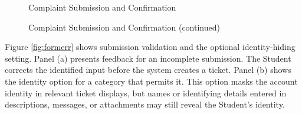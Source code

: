 \renewcommand{\thefigure}{5.7}
\begin{figure}[htbp]
    \centering
    \begin{minipage}[t]{0.43\linewidth}
        \centering
        \vspace{0pt}
        \par{}\par
    \end{minipage}\hspace{0.04\linewidth}
    \begin{minipage}[t]{0.43\linewidth}
        \centering
        \vspace{0pt}
        \par{}\par
    \end{minipage}
    \caption{Complaint Submission and Confirmation}
    \label{fig:form}
\end{figure}
\FloatBarrier

\begin{figure}[htbp]
    \ContinuedFloat
    \centering
    \begin{minipage}[t]{0.43\linewidth}
        \centering
        \vspace{0pt}
        \par{}\par
    \end{minipage}
    \caption[]{Complaint Submission and Confirmation (continued)}
\end{figure}
\FloatBarrier

Figure \ref{fig:formerr} shows submission validation and the optional identity-hiding setting. Panel (a) presents feedback for an incomplete submission. The Student corrects the identified input before the system creates a ticket. Panel (b) shows the identity option for a category that permits it. This option masks the account identity in relevant ticket displays, but names or identifying details entered in descriptions, messages, or attachments may still reveal the Student's identity.

